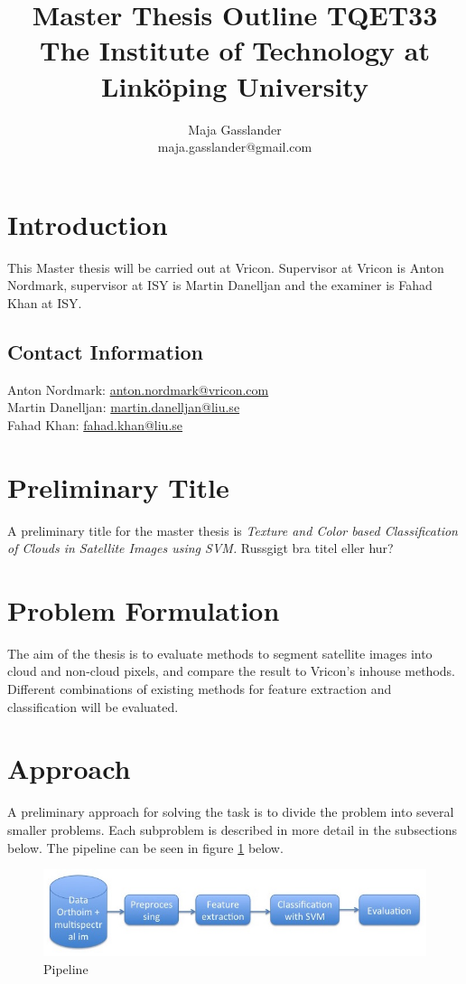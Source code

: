 \documentclass{article}
\title{Master Thesis Outline TQET33 \\
\normalsize{The Institute of Technology at Linköping University}}
\author{Maja Gasslander \\ \normalsize{maja.gasslander@gmail.com}}
\begin{document}
\maketitle
\newpage
\section{Introduction}
This Master thesis will be carried out at Vricon. Supervisor at Vricon is Anton Nordmark, supervisor at ISY is Martin Danelljan and the examiner is Fahad Khan at ISY. 

\subsection{Contact Information}
Anton Nordmark: \href{mailto:anton.nordmark@vricon.com}{anton.nordmark@vricon.com}\\
Martin Danelljan: \href{mailto:martin.danelljan@liu.se}{martin.danelljan@liu.se} \\
Fahad Khan: \href{mailto:fahad.khan@liu.se}{fahad.khan@liu.se}


\section{Preliminary Title}
A preliminary title for the master thesis is \emph{Texture and Color based Classification of Clouds in Satellite Images using SVM.} Russgigt bra titel eller hur?

\section{Problem Formulation}
The aim of the thesis is to evaluate methods to segment satellite images into cloud and non-cloud pixels, and compare the result to Vricon's inhouse methods. Different combinations of existing methods for feature extraction and classification will be evaluated.

\section{Approach}
A preliminary approach for solving the task is to divide the problem into several smaller problems. Each subproblem is described in more detail in the subsections below. The pipeline can be seen in figure \ref{fig:pipeline} below.

\begin{figure}[h!]
    \centering
    \includegraphics[scale=0.5]{fig/pipeline}
    \caption{Pipeline}
    \label{fig:pipeline}
\end{figure}
\end{document}
